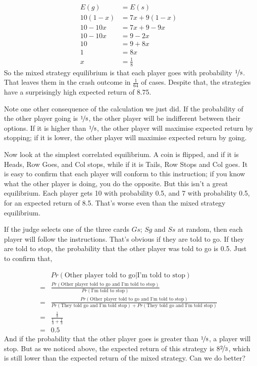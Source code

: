 \documentclass[openany]{book}
\begin{document}
\begin{align*}
E(g) &= E(s) \\
10(1-x) &= 7x + 9(1-x) \\
10 - 10x &= 7x + 9 - 9x \\
10 - 10x &= 9 - 2x \\
10 &= 9 + 8x \\
1 &= 8x \\
x &= \frac{1}{8}
\end{align*}
So the mixed strategy equilibrium is that each player goes with probability $\nicefrac{1}{8}$. That leaves them in the crash outcome in $\frac{1}{64}$ of cases. Despite that, the strategies have a surprisingly high expected return of 8.75.

Note one other consequence of the calculation we just did. If the probability of the other player going is $\nicefrac{1}{8}$, the other player will be indifferent between their options. If it is higher than $\nicefrac{1}{8}$, the other player will maximise expected return by stopping; if it is lower, the other player will maximise expected return by going.

Now look at the simplest correlated equilibrium. A coin is flipped, and if it is Heads, Row Goes, and Col stops, while if it is Tails, Row Stops and Col goes. It is easy to confirm that each player will conform to this instruction; if you know what the other player is doing, you do the opposite. But this isn't a great equilibrium. Each player gets 10 with probability 0.5, and 7 with probability 0.5, for an expected return of 8.5. That's worse even than the mixed strategy equilibrium.

If the judge selects one of the three cards $Gs$; $Sg$ and $Ss$ at random, then each player will follow the instructions. That's obvious if they are told to go. If they are told to stop, the probability that the other player was told to go is 0.5. Just to confirm that,

\begin{align*}
&Pr(\text{Other player told to go}|\text{I'm told to stop}) \\
= &\frac{Pr(\text{Other player told to go and I'm told to stop})}{Pr(\text{I'm told to stop})} \\
= &\frac{Pr(\text{Other player told to go and I'm told to stop})}{Pr(\text{They told go and I'm told stop}) + Pr(\text{They told go and I'm told stop})} \\
= &\frac{\frac{1}{3}}{\frac{1}{3} + \frac{1}{3}} \\
= &0.5
\end{align*}
And if the probability that the other player goes is greater than $\nicefrac{1}{8}$, a player will stop. But as we noticed above, the expected return of this strategy is 8$\nicefrac{2}{3}$, which is still lower than the expected return of the mixed strategy. Can we do better?
\end{document}
